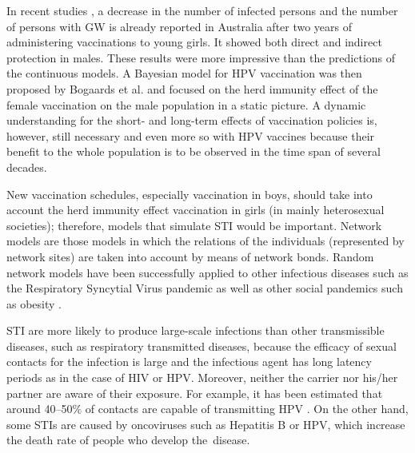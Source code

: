 In recent studies \cite{Fairley,Ali}, a decrease in the number of infected persons and the number of persons with GW is already reported in Australia after two years of administering vaccinations to young girls. It showed both direct and indirect protection in males. These results were more impressive than the predictions of the continuous models. A Bayesian model for HPV vaccination was then proposed by Bogaards et al. \cite{Bogaards} and focused on the herd immunity effect of the female vaccination on the male population in a static picture. A dynamic understanding for the short- and long-term effects of vaccination policies is, however, still necessary and even more so with HPV vaccines because their benefit to the whole population is to be observed in the time span of several decades.

New vaccination schedules, especially vaccination in boys, should take into account the herd immunity effect vaccination in girls (in mainly heterosexual societies); therefore, models that simulate {STI} would be important. Network models are those models in which the relations of the individuals (represented by network sites) are taken into account by means of network bonds. Random network models have been successfully applied to other infectious diseases such as the Respiratory Syncytial Virus pandemic \cite{RSV} as well as other social pandemics such as obesity \cite{Obesity}.

STI are more likely to produce large-scale infections than other transmissible diseases, such as respiratory transmitted diseases, because the efficacy of sexual contacts for the infection is large and the infectious agent has long latency periods as in the case of HIV or HPV. Moreover, neither the carrier nor his/her partner are aware of their exposure. For example, it has been estimated that around 40--50$\%$ of contacts are capable of transmitting HPV \cite{HPV}. On the other hand, some STIs are caused by oncoviruses such as Hepatitis B or HPV, which increase the death rate of people who develop the~disease.

